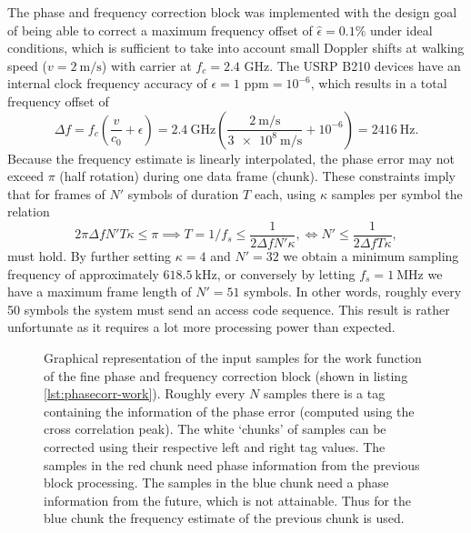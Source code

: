 The phase and frequency correction block was implemented with the design goal of being able to correct a maximum frequency offset of \(\hat{\epsilon} = 0.1\%\) under ideal conditions, which is sufficient to take into account small Doppler shifts at walking speed (\(v = \SI{2}{\meter\per\second}\)) with carrier at \(f_c = 2.4\) GHz. The USRP B210 devices have an internal clock frequency accuracy of \(\epsilon = 1\text{ ppm} = 10^{-6}\), which results in a total frequency offset of
\begin{equation}\label{eq:doppler}
	\Delta f = f_c \left( \frac{v}{c_0} + \epsilon \right)
	= \SI{2.4}{\giga\hertz} \left(
		\frac{\SI{2}{\meter\per\second}}{\SI{3e8}{\meter\per\second}} + 10^{-6} 
	\right) = \SI{2416}{\hertz}.
\end{equation}
Because the frequency estimate is linearly interpolated, the phase error may not exceed \(\pi\) (half rotation) during one data frame (chunk). These constraints imply that for frames of \(N'\) symbols of duration \(T\) each, using \(\kappa\) samples per symbol the relation
\begin{equation}\label{Doppler-shift}
	2\pi\Delta f N' T \kappa \leq \pi
	\implies T = 1/f_s \leq \frac{1}{2\Delta f N' \kappa},
	\iff N' \leq \frac{1}{2\Delta f T \kappa},
\end{equation}
must hold. By further setting \(\kappa = 4\) and \(N' = 32\) we obtain a minimum sampling frequency of approximately \(\SI{618.5}{\kilo\hertz}\), or conversely by letting \(f_s = \SI{1}{\mega\hertz}\) we have a maximum frame length of \(N' = 51\) symbols. In other words, roughly every 50 symbols the system must send an access code sequence. This result is rather unfortunate as it requires a lot more processing power than expected.

\begin{figure}
	\centering
	
	\caption{
		Graphical representation of the input samples for the work function of the fine phase and frequency correction block (shown in listing \ref{lst:phasecorr-work}). Roughly every \(N\) samples there is a tag containing the information of the phase error (computed using the cross correlation peak). The white `chunks' of samples can be corrected using their respective left and right tag values. The samples in the red chunk need phase information from the previous block processing. The samples in the blue chunk need a phase information from the future, which is not attainable. Thus for the blue chunk the frequency estimate of the previous chunk is used.
		\label{fig:phasecorr-chunks}
	}
\end{figure}


